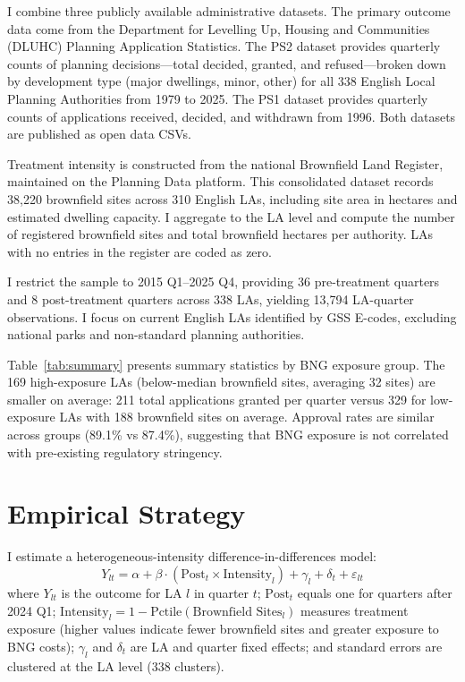\documentclass[12pt]{article}
\begin{document}
I combine three publicly available administrative datasets. The primary outcome data come from the Department for Levelling Up, Housing and Communities (DLUHC) Planning Application Statistics. The PS2 dataset provides quarterly counts of planning decisions---total decided, granted, and refused---broken down by development type (major dwellings, minor, other) for all 338 English Local Planning Authorities from 1979 to 2025. The PS1 dataset provides quarterly counts of applications received, decided, and withdrawn from 1996. Both datasets are published as open data CSVs.

Treatment intensity is constructed from the national Brownfield Land Register, maintained on the Planning Data platform. This consolidated dataset records 38,220 brownfield sites across 310 English LAs, including site area in hectares and estimated dwelling capacity. I aggregate to the LA level and compute the number of registered brownfield sites and total brownfield hectares per authority. LAs with no entries in the register are coded as zero.

I restrict the sample to 2015 Q1--2025 Q4, providing 36 pre-treatment quarters and 8 post-treatment quarters across 338 LAs, yielding 13,794 LA-quarter observations. I focus on current English LAs identified by GSS E-codes, excluding national parks and non-standard planning authorities.



Table~\ref{tab:summary} presents summary statistics by BNG exposure group. The 169 high-exposure LAs (below-median brownfield sites, averaging 32 sites) are smaller on average: 211 total applications granted per quarter versus 329 for low-exposure LAs with 188 brownfield sites on average. Approval rates are similar across groups (89.1\% vs 87.4\%), suggesting that BNG exposure is not correlated with pre-existing regulatory stringency.

\section{Empirical Strategy}

I estimate a heterogeneous-intensity difference-in-differences model:
\begin{equation}
Y_{lt} = \alpha + \beta \cdot (\text{Post}_t \times \text{Intensity}_l) + \gamma_l + \delta_t + \varepsilon_{lt}
\label{eq:main}
\end{equation}
where $Y_{lt}$ is the outcome for LA $l$ in quarter $t$; $\text{Post}_t$ equals one for quarters after 2024 Q1; $\text{Intensity}_l = 1 - \text{Pctile}(\text{Brownfield Sites}_l)$ measures treatment exposure (higher values indicate fewer brownfield sites and greater exposure to BNG costs); $\gamma_l$ and $\delta_t$ are LA and quarter fixed effects; and standard errors are clustered at the LA level (338 clusters).
\end{document}
